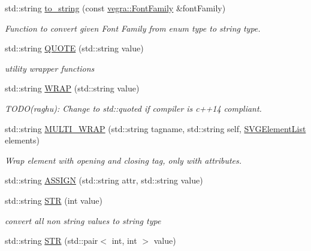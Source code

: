 \begin{DoxyCompactItemize}
\item 
std\+::string \mbox{\hyperlink{namespacevegra_a776f7d3c50693931a482a34284b43ede}{to\+\_\+string}} (const \mbox{\hyperlink{namespacevegra_a342c4e8c946c4f729d694257d1ed876b}{vegra\+::\+Font\+Family}} \&font\+Family)
\begin{DoxyCompactList}\small\item\em Function to convert given Font Family from enum type to string type. \end{DoxyCompactList}\item 
std\+::string \mbox{\hyperlink{namespacevegra_a35980cba2dab0fb1d1e3154dfa23cbfc}{Q\+U\+O\+TE}} (std\+::string value)
\begin{DoxyCompactList}\small\item\em utility wrapper functions \end{DoxyCompactList}\item 
std\+::string \mbox{\hyperlink{namespacevegra_ad53777752123522d1807f483fa01c0a5}{W\+R\+AP}} (std\+::string value)
\begin{DoxyCompactList}\small\item\em T\+O\+D\+O(raghu)\+: Change to std\+::quoted if compiler is c++14 compliant. \end{DoxyCompactList}\item 
std\+::string \mbox{\hyperlink{namespacevegra_a46b18aa974bf220f63e7d00163eb549a}{M\+U\+L\+T\+I\+\_\+\+W\+R\+AP}} (std\+::string tagname, std\+::string self, \mbox{\hyperlink{namespacevegra_a2722f5eceb74f65746a02a57b71d125e}{S\+V\+G\+Element\+List}} elements)
\begin{DoxyCompactList}\small\item\em Wrap element with opening and closing tag, only with attributes. \end{DoxyCompactList}\item 
std\+::string \mbox{\hyperlink{namespacevegra_a4893502d3540c9e206e49072ffaa4316}{A\+S\+S\+I\+GN}} (std\+::string attr, std\+::string value)
\item 
std\+::string \mbox{\hyperlink{namespacevegra_ac0412cf8d762772ec0857239d5d47eb3}{S\+TR}} (int value)
\begin{DoxyCompactList}\small\item\em convert all non string values to string type \end{DoxyCompactList}\item 
std\+::string \mbox{\hyperlink{namespacevegra_a5365ef337b0b536116d63a2352fd903d}{S\+TR}} (std\+::pair$<$ int, int $>$ value)
\end{DoxyCompactItemize}
